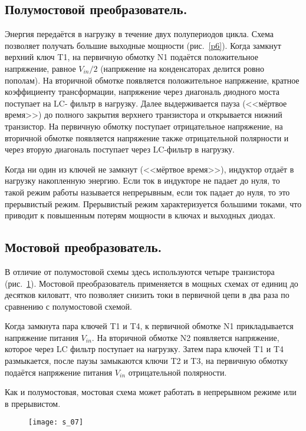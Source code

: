 \subsection{Полумостовой преобразователь.}

	Энергия передаётся в нагрузку в течение двух полупериодов цикла. Схема позволяет получать большие выходные мощности (рис.~\ref{p6}). Когда замкнут верхний ключ T1, на первичную обмотку N1 подаётся положительное напряжение, равное $ V_{in}/2 $ (напряжение на конденсаторах делится ровно пополам). На вторичной обмотке появляется положительное напряжение, кратное коэффициенту трансформации, напряжение через диагональ диодного моста поступает на LC- фильтр в нагрузку. Далее выдерживается пауза (<<мёртвое время>>) до полного закрытия верхнего транзистора и открывается нижний транзистор. На первичную обмотку поступает отрицательное напряжение, на вторичной обмотке появляется напряжение также отрицательной полярности и через вторую диагональ поступает через LC-фильтр в нагрузку. 

	Когда ни один из ключей не замкнут (<<мёртвое время>>), индуктор отдаёт в нагрузку накопленную энергию. Если ток в индукторе не падает до нуля, то такой режим работы называется непрерывным, если ток падает до нуля, то это прерывистый режим. Прерывистый режим характеризуется большими токами, что приводит к повышенным потерям мощности в ключах и выходных диодах.
	
\subsection{Мостовой преобразователь.}

	В отличие от полумостовой схемы здесь используются четыре 
транзистора (рис.~\ref{p7}). Мостовой преобразователь применяется в мощных схемах от единиц до десятков киловатт, что позволяет снизить токи в первичной цепи в два раза по сравнению с полумостовой схемой.

	Когда замкнута пара ключей T1 и T4, к первичной обмотке N1 прикладывается напряжение питания $ V_{in} $. На вторичной обмотке N2 появляется напряжение, которое через LC фильтр поступает 
на нагрузку. Затем пара ключей T1 и T4 размыкается, после паузы замыкаются ключи T2 и T3, на первичную обмотку подаётся напряжение питания $ V_{in} $ отрицательной полярности. 

	Как и полумостовая, мостовая схема может работать в непрерывном режиме или в прерывистом.

\begin{figure}[ht]
	\center
	\texttt{[image: s\_07]}
	\caption{}\label{p7}
\end{figure}

